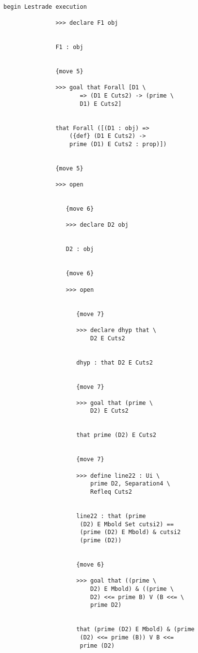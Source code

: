 \documentclass[12pt]{article}
\begin{document}
\begin{verbatim}

begin Lestrade execution

               >>> declare F1 obj


               F1 : obj


               {move 5}

               >>> goal that Forall [D1 \
                      => (D1 E Cuts2) -> (prime \
                      D1) E Cuts2]


               that Forall ([(D1 : obj) => 
                   ({def} (D1 E Cuts2) -> 
                   prime (D1) E Cuts2 : prop)])


               {move 5}

               >>> open


                  {move 6}

                  >>> declare D2 obj


                  D2 : obj


                  {move 6}

                  >>> open


                     {move 7}

                     >>> declare dhyp that \
                         D2 E Cuts2


                     dhyp : that D2 E Cuts2


                     {move 7}

                     >>> goal that (prime \
                         D2) E Cuts2


                     that prime (D2) E Cuts2


                     {move 7}

                     >>> define line22 : Ui \
                         prime D2, Separation4 \
                         Refleq Cuts2


                     line22 : that (prime 
                      (D2) E Mbold Set cutsi2) == 
                      (prime (D2) E Mbold) & cutsi2 
                      (prime (D2))


                     {move 6}

                     >>> goal that ((prime \
                         D2) E Mbold) & ((prime \
                         D2) <<= prime B) V (B <<= \
                         prime D2)


                     that (prime (D2) E Mbold) & (prime 
                      (D2) <<= prime (B)) V B <<= 
                      prime (D2)



\end{verbatim}
\end{document}
